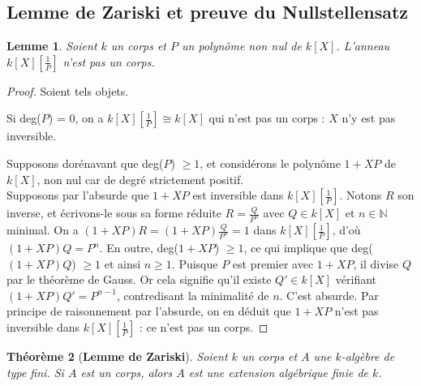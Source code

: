 \documentclass[10pt, twoside]{article}
\theoremstyle{plain}
\newtheorem{theorem}{Théorème}[section]
\theoremstyle{definition}
\theoremstyle{plain}
\theoremstyle{plain}
\newtheorem{lemma}[theorem]{Lemme}
\theoremstyle{definition}
\theoremstyle{remark}
\begin{document}
\subsection{Lemme de Zariski et preuve du Nullstellensatz}

\begin{lemma}\label{lem:local pas corps}
    Soient $k$ un corps et $P$ un polynôme non nul de $k[X]$. L'anneau $k[X][\frac{1}{P}]$ n'est pas un corps.
\end{lemma}

\begin{proof}
    Soient tels objets.
    
    Si deg($P$) = 0, on a $k[X][\frac{1}{P}] \cong k[X]$ qui n'est pas un corps : $X$ n'y est pas inversible.

    Supposons dorénavant que deg($P$) $\geq 1$, et considérons le polynôme $1 + XP$ de $k[X]$, non nul car de degré strictement positif.\\
    Supposons par l'absurde que $1 + XP$ est inversible dans $k[X][\frac{1}{P}]$. Notons $R$ son inverse, et écrivons-le sous sa forme réduite $R = \frac{Q}{P^n}$ avec $Q \in k[X]$ et $n \in \mathbb{N}$ minimal. On a $(1 + XP)R = (1 + XP)\frac{Q}{P^n} = 1$ dans $k[X][\frac{1}{P}]$, d'où $(1 + XP)Q = P^n$. En outre, deg($1 + XP$) $\geq 1$, ce qui implique que deg($(1+XP)Q$) $\geq 1$ et ainsi $n \geq 1$. Puisque $P$ est premier avec $1 + XP$, il divise $Q$ par le théorème de Gauss. Or cela signifie qu'il existe $Q' \in k[X]$ vérifiant $(1+XP)Q' = P^{n-1}$, contredisant la minimalité de $n$. C'est absurde. Par principe de raisonnement par l'absurde, on en déduit que $1 + XP$ n'est pas inversible dans $k[X][\frac{1}{P}]$ : ce n'est pas un corps.
\end{proof}

\begin{theorem}[\textbf{Lemme de Zariski}]\label{thm:lem Zariski}
    Soient $k$ un corps et $A$ une $k$-algèbre de type fini. Si $A$ est un corps, alors $A$ est une extension algébrique finie de $k$.
\end{theorem}
\end{document}
